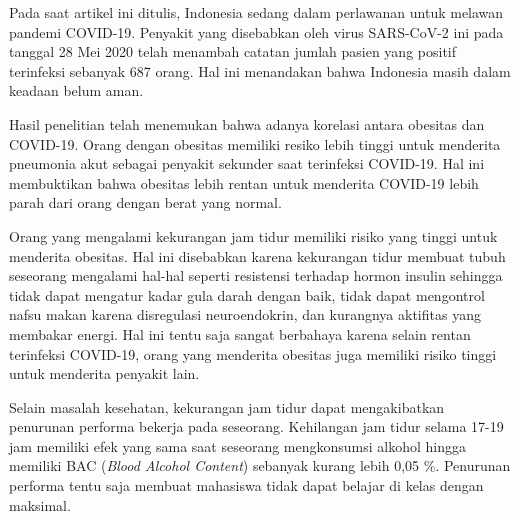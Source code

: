 \documentclass[12pt, a4paper, twoside]{article}
\begin{document}
Pada saat artikel ini ditulis, Indonesia sedang dalam perlawanan untuk melawan pandemi COVID-19. Penyakit yang disebabkan oleh virus SARS-CoV-2 ini pada tanggal 28 Mei 2020 telah menambah catatan jumlah pasien yang positif terinfeksi sebanyak 687 orang. Hal ini menandakan bahwa Indonesia masih dalam keadaan belum aman. \cite{Putri.2020} 

Hasil penelitian telah menemukan bahwa adanya korelasi antara obesitas dan COVID-19. Orang dengan obesitas memiliki resiko lebih tinggi untuk menderita pneumonia akut sebagai penyakit sekunder saat terinfeksi COVID-19. Hal ini membuktikan bahwa obesitas lebih rentan untuk menderita COVID-19 lebih parah dari orang dengan berat yang normal. \cite{Cai.2020}

Orang yang mengalami kekurangan jam tidur memiliki risiko yang tinggi untuk menderita obesitas. Hal ini disebabkan karena kekurangan tidur membuat tubuh seseorang mengalami hal-hal seperti resistensi terhadap hormon insulin sehingga tidak dapat mengatur kadar gula darah dengan baik, tidak dapat mengontrol nafsu makan karena disregulasi neuroendokrin, dan kurangnya aktifitas yang membakar energi. Hal ini tentu saja sangat berbahaya karena selain rentan terinfeksi COVID-19, orang
yang menderita obesitas juga memiliki risiko tinggi untuk menderita penyakit lain. \cite{Knutson.2007}

Selain masalah kesehatan, kekurangan jam tidur dapat mengakibatkan penurunan performa bekerja pada seseorang. Kehilangan jam tidur selama 17-19 jam memiliki efek yang sama saat seseorang mengkonsumsi alkohol hingga memiliki BAC (\textit{Blood Alcohol Content}) sebanyak kurang lebih 0,05 \%. Penurunan performa tentu saja membuat mahasiswa tidak dapat belajar di kelas dengan maksimal. \cite{Williamson.2000}

\printbibliography[title = Daftar Pustaka]
\end{document}
